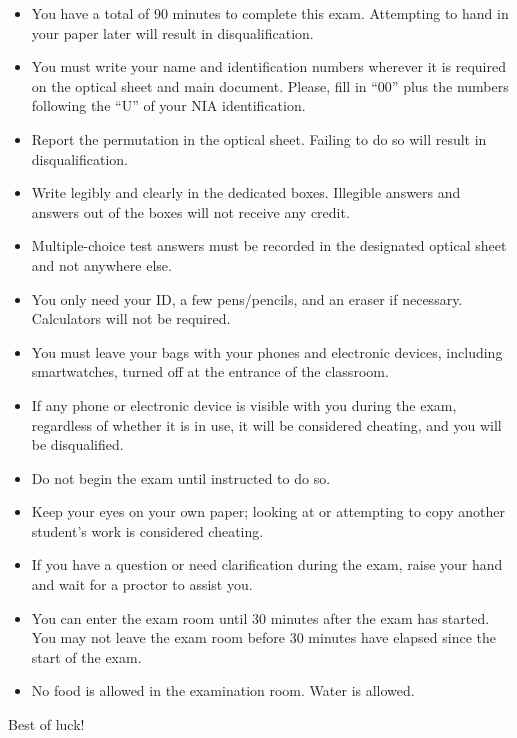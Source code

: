 \documentclass{article}
\begin{document}
\begin{itemize}
    \item You have a total of 90 minutes to complete this exam. Attempting to hand in your paper later will result in disqualification.
    \item You must write your name and identification numbers wherever it is required on the optical sheet and main document. Please, fill in ``00'' plus the numbers following the ``U'' of your NIA identification.
    \item Report the permutation in the optical sheet. Failing to do so will result in disqualification.
    \item Write legibly and clearly in the dedicated boxes. Illegible answers and answers out of the boxes will not receive any credit.
    \item Multiple-choice test answers must be recorded in the designated optical sheet and not anywhere else. 
    \item You only need your ID, a few pens/pencils, and an eraser if necessary. Calculators will not be required.
    \item You must leave your bags with your phones and electronic devices, including smartwatches, turned off at the entrance of the classroom.
    \item If any phone or electronic device is visible with you during the exam, regardless of whether it is in use, it will be considered cheating, and you will be disqualified.
    \item Do not begin the exam until instructed to do so.
    \item Keep your eyes on your own paper; looking at or attempting to copy another student's work is considered cheating.
    \item If you have a question or need clarification during the exam, raise your hand and wait for a proctor to assist you.
    \item You can enter the exam room until 30 minutes after the exam has started. You may not leave the exam room before 30 minutes have elapsed since the start of the exam.
    \item No food is allowed in the examination room. Water is allowed.
\end{itemize}

\vspace{1cm}

Best of luck!

\newpage


\\[2em]
\end{document}
